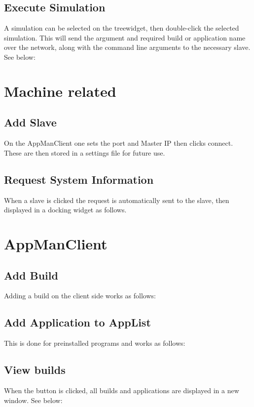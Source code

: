 \documentclass[a4paper,12pt,final]{article}
\begin{document}
\subsection{Execute Simulation}
A simulation can be selected on the treewidget, then double-click the selected simulation. This will send the argument and required build or application name over the network, along with the command line arguments to the necessary slave. See below:

\section{Machine related}

\subsection{Add Slave}
On the AppManClient one sets the port and Master IP then clicks connect. These are then stored in a settings file for future use. 

\subsection{Request System Information}
When a slave is clicked the request is automatically sent to the slave, then displayed in a docking widget as follows.

\section{AppManClient}

\subsection{Add Build}
Adding a build on the client side works as follows:

\subsection{Add Application to AppList}
This is done for preinstalled programs and works as follows:

\subsection{View builds}
When the button is clicked, all builds and applications are displayed in a new window. See below:

\newpage
\end{document}
